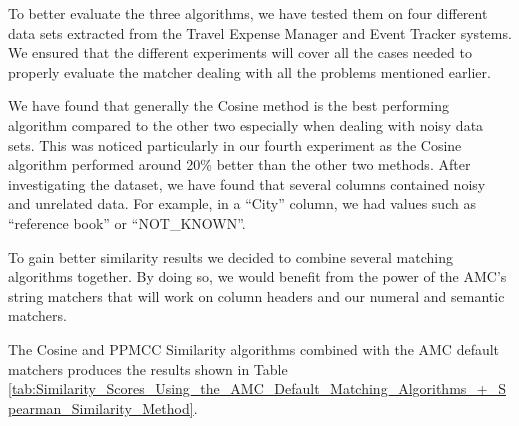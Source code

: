 To better evaluate the three algorithms, we have tested them on four different data sets extracted from the Travel Expense Manager and Event Tracker systems. We ensured that the different experiments will cover all the cases needed to properly evaluate the matcher dealing with all the problems mentioned earlier.

We have found that generally the Cosine method is the best performing algorithm compared to the other two especially when dealing with noisy data sets. This was noticed particularly in our fourth experiment as the Cosine algorithm performed around 20\% better than the other two methods. After investigating the dataset, we have found that several columns contained noisy and unrelated data. For example, in a ``City'' column, we had values such as ``reference book'' or ``NOT\_KNOWN''.

To gain better similarity results we decided to combine several matching algorithms together. By doing so, we would benefit from the power of the AMC's string matchers that will work on column headers and our numeral and semantic matchers.

The Cosine and PPMCC Similarity algorithms combined with the AMC default matchers produces the results shown in Table \ref{tab:Similarity_Scores_Using_the_AMC_Default_Matching_Algorithms_+_Spearman_Similarity_Method}.

